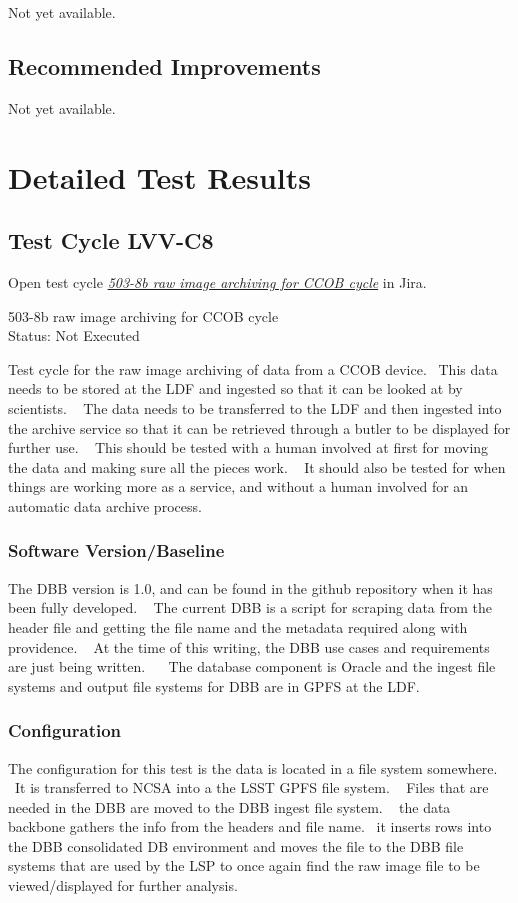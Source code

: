 \documentclass[DM,lsstdraft,STR,toc]{lsstdoc}
\begin{document}
Not yet available.

\subsection{Recommended Improvements}
\label{sect:recommendations}

Not yet available.

\newpage
\section{Detailed Test Results}
\label{sect:detailedtestresults}


  \subsection{Test Cycle LVV-C8 }

Open test cycle {\it \href{https://jira.lsstcorp.org/secure/Tests.jspa#/testrun/LVV-C8}{503-8b raw image archiving for CCOB cycle}} in Jira.

  503-8b raw image archiving for CCOB cycle\\
  Status: Not Executed

  Test cycle for the raw image archiving of data from a CCOB device. ~This
data needs to be stored at the LDF and ingested so that it can be looked
at by scientists. ~ The data needs to be transferred to the LDF and then
ingested into the archive service so that it can be retrieved through a
butler to be displayed for further use. ~ This should be tested with a
human involved at first for moving the data and making sure all the
pieces work. ~ It should also be tested for when things are working more
as a service, and without a human involved for an automatic data archive
process. ~


  \subsubsection{Software Version/Baseline}
    The DBB version is 1.0, and can be found in the github repository when
it has been fully developed. ~ The current DBB is a script for scraping
data from the header file and getting the file name and the metadata
required along with providence. ~ At the time of this writing, the DBB
use cases and requirements are just being written. ~ ~The database
component is Oracle and the ingest file systems and output file systems
for DBB are in GPFS at the LDF.~~


  \subsubsection{Configuration}
    The configuration for this test is the data is located in a file system
somewhere. ~It is transferred to NCSA into a the LSST GPFS file system.
~ Files that are needed in the DBB are moved to the DBB ingest file
system. ~ the data backbone gathers the info from the headers and file
name. ~it inserts rows into the DBB consolidated DB environment and
moves the file to the DBB file systems that are used by the LSP to once
again find the raw image file to be viewed/displayed for further
analysis. ~
\end{document}
